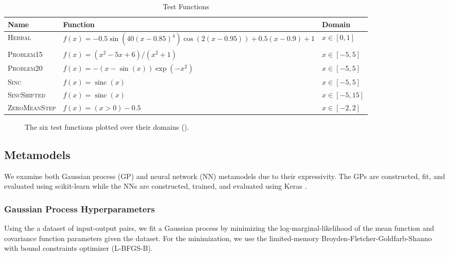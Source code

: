 \documentclass[conference]{IEEEtran}
\DeclareMathOperator{\sinc}{sinc}
\begin{document}
	\begin{table*}[htbp]
    \renewcommand{\arraystretch}{1.3}
    \centering
    \caption{Test Functions}
    \label{tab:test_fns}
        \begin{tabular}{lll}
        \toprule 
        \bfseries Name & \bfseries Function & \bfseries Domain \\ \midrule
	    \textsc{Hebbal} & $f(x) = -0.5 \sin\left(40 (x-0.85)^4\right) \cos(2(x-0.95)) + 0.5(x-0.9) + 1$ & $x \in [0, 1]$ \\
	    \textsc{Problem15} & $f(x) = (x^2 - 5x + 6) / (x^2 + 1) $ & $x \in [-5, 5]$ \\
	    \textsc{Problem20} & $f(x) = -(x - \sin(x))\exp(-x^2) $ & $x \in [-5, 5]$ \\
	    \textsc{Sinc} & $f(x) = \sinc(x) $ & $x \in [-5, 5]$ \\
	    \textsc{SincShifted} & $f(x) = \sinc(x) $ & $x \in [-5, 15]$ \\
	    \textsc{ZeroMeanStep} & $f(x) = (x > 0) - 0.5 $ & $x \in [-2, 2]$ \\
	    \bottomrule
	    \end{tabular}
	\end{table*}
	
	\begin{figure*}[htbp]
	    \centering
	    
	    \caption{The six test functions plotted over their domains ().}
	    \label{fig:test_fns}
	\end{figure*}
	
	\subsection{Metamodels}
	
	We examine both Gaussian process (GP) and neural network (NN) metamodels due to their expressivity. The GPs are constructed, fit, and evaluated using scikit-learn \cite{Scikit-learn:Python} while the NNs are constructed, trained, and evaluated using Keras \cite{Keras:API}.
	
	\subsubsection{Gaussian Process Hyperparameters}
	
	Using the a dataset of input-output pairs, we fit a Gaussian process by minimizing the log-marginal-likelihood of the mean function and covariance function parameters given the dataset. For the minimization, we use the limited-memory Broyden-Fletcher-Goldfarb-Shanno with bound constraints optimizer (\textsc{L-BFGS-B}).
	
\end{document}
